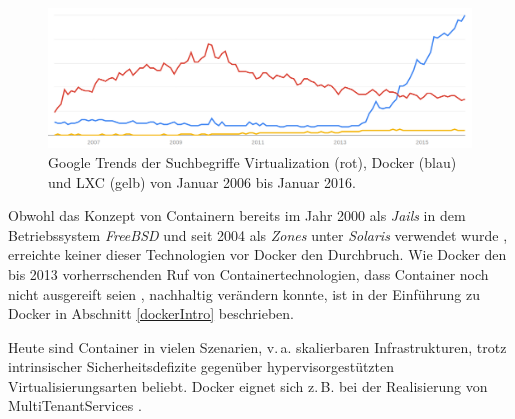 \documentclass[../main.tex]{subfiles}
\begin{document}
  \begin{figure}[h]
      \centering
      \includegraphics[width=1.0\textwidth]{./images/googletrend_dockerVirtualizationLXC.png}
      \caption{Google Trends der Suchbegriffe \glqq{}Virtualization\grqq{} (rot), \glqq{}Docker\grqq{} (blau) und \glqq{}LXC\grqq{} (gelb) von Januar 2006 bis Januar 2016\cite{googleTrends}.}
      \label{fig:overview_googleTrends}
  \end{figure}

  Obwohl das Konzept von Containern bereits im Jahr 2000 als \emph{Jails} in dem Betriebssystem \emph{FreeBSD} und seit 2004 als \emph{Zones} unter \emph{Solaris} verwendet wurde \cite{zonesReleasenotes}\cite{jailsReleasenotes}, erreichte keiner dieser Technologien vor Docker den Durchbruch. Wie Docker den bis 2013 vorherrschenden Ruf von Containertechnologien, dass Container noch nicht ausgereift seien \cite[S.8]{containerVirtPerformance}, nachhaltig verändern konnte, ist in der Einführung zu Docker in Abschnitt \ref{dockerIntro} beschrieben.

  Heute sind Container in vielen Szenarien, v.\,a. skalierbaren Infrastrukturen, trotz intrinsischer Sicherheitsdefizite gegenüber hypervisorgestützten Virtualisierungsarten beliebt. Docker eignet sich z.\,B. bei der Realisierung von \glspl{MultiTenantService} \cite[S.6]{dockerBook}\cite{dockerUnderstandingDocker}.

\end{document}
